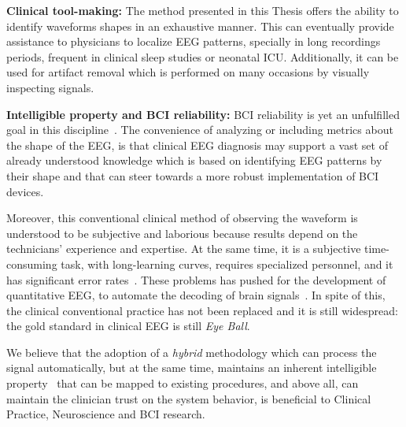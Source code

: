\textbf{Clinical tool-making:}
The method presented in this Thesis offers the ability to identify waveforms shapes in an exhaustive manner.  This can eventually provide assistance to physicians to localize EEG patterns, specially in long recordings periods, frequent in clinical sleep studies or neonatal ICU.  Additionally, it can be used for artifact removal which is performed on many occasions by visually inspecting signals. %


\textbf{Intelligible property and BCI reliability:}
BCI reliability is yet an unfulfilled goal in this discipline~\cite{WolpawJonathanR2012}. The convenience of analyzing or including metrics about the shape of the EEG, is that clinical EEG diagnosis may support a vast set of already understood knowledge which is based on identifying EEG patterns by their shape and that can steer towards a more robust implementation of BCI devices.  


Moreover, this conventional clinical method of observing the waveform is understood to be subjective and laborious because results depend on the technicians' experience and expertise.   At the same time, it is a subjective time-consuming task, with long-learning curves, requires specialized personnel, and it has significant error rates~\cite{Tjepkema-Cloostermans2018}.  These problems has pushed for the development of quantitative EEG, to automate the decoding of brain signals~\cite{Thakor2004}.  In spite of this, the clinical conventional practice has not been replaced and it is still widespread: the gold standard in clinical EEG is still \textit{Eye Ball}.

We believe that the adoption of a \textit{hybrid} methodology which can process the signal automatically, but at the same time, maintains an inherent intelligible property~\cite{j2018challenge} that can be mapped to existing procedures, and above all, can maintain the clinician trust on the system behavior, is beneficial to Clinical Practice, Neuroscience and BCI research. 


